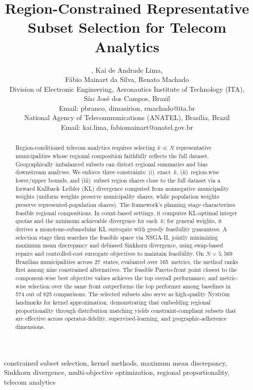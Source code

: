 \documentclass[10pt,journal]{IEEEtran}
\title{Region-Constrained Representative Subset Selection for Telecom Analytics}
\author{%
\IEEEauthorblockN{Paulo Ricardo Branco da Silva\IEEEauthorrefmark{1},
Dimas Irion Alves\IEEEauthorrefmark{1}}, Kai de Andrade Lima\IEEEauthorrefmark{2}, \\
Fábio Mainart da Silva\IEEEauthorrefmark{2}, Renato Machado\IEEEauthorrefmark{1}\\
\IEEEauthorrefmark{1}Division of Electronic Engineering, Aeronautics Institute of Technology (ITA), São José dos Campos, Brazil\\
Email: {pbranco, dimasirion, rmachado}@ita.br\\
\IEEEauthorrefmark{2}National Agency of Telecommunications (ANATEL), Brasília, Brazil\\
Email: {kai.lima, fabiomainart}@anatel.gov.br
\vspace{-1.0cm}
}
\newcommand{\datasetN}{5{,}569}
\newcommand{\1}{\mathbf{1}}
\theoremstyle{ieeethm}
\begin{document}
\maketitle


\begin{abstract}
Region-conditioned telecom analytics requires selecting $k\!\ll\!N$ representative municipalities whose regional composition faithfully reflects the full dataset. Geographically imbalanced subsets can distort regional summaries and bias downstream analyses. We enforce three constraints: (i)~exact~$k$, (ii)~region-wise lower/upper bounds, and (iii)~subset region shares close to the full dataset via a forward Kullback--Leibler (KL) divergence computed from nonnegative municipality weights (uniform weights preserve municipality shares, while population weights preserve represented-population shares). The framework's planning stage characterizes feasible regional compositions. In count-based settings, it computes KL-optimal integer quotas and the minimum achievable divergence for each~$k$; for general weights, it derives a monotone-submodular KL surrogate with greedy feasibility guarantees. A selection stage then searches the feasible space via NSGA-II, jointly minimizing maximum mean discrepancy and debiased Sinkhorn divergence, using swap-based repairs and controlled-cost surrogate objectives to maintain feasibility. On $N{=}\datasetN$ Brazilian municipalities across 27~states, evaluated over 165~metrics, the method ranks first among nine constrained alternatives. The feasible Pareto-front point closest to the component-wise best objective values achieves the top overall performance, and metric-wise selection over the same front outperforms the top performer among baselines in 574 out of 825 comparisons. The selected subsets also serve as high-quality Nyström landmarks for kernel approximation, demonstrating that embedding regional proportionality through distribution matching yields constraint-compliant subsets that are effective across operator-fidelity, supervised-learning, and geographic-adherence dimensions.
\end{abstract}

\begin{IEEEkeywords}
constrained subset selection, kernel methods, maximum mean discrepancy, Sinkhorn divergence, multi-objective optimization, regional proportionality, telecom analytics
\end{IEEEkeywords}
\end{document}
